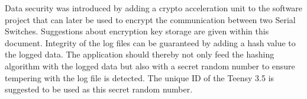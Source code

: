 Data security was introduced by adding a crypto acceleration unit to the software project that can later be used to encrypt the communication between two Serial Switches. Suggestions about encryption key storage are given within this document. Integrity of the log files can be guaranteed by adding a hash value to the logged data. The application should thereby not only feed the hashing algorithm with the logged data but also with a secret random number to ensure tempering with the log file is detected. The unique ID of the Teensy 3.5 is suggested to be used as this secret random number.
